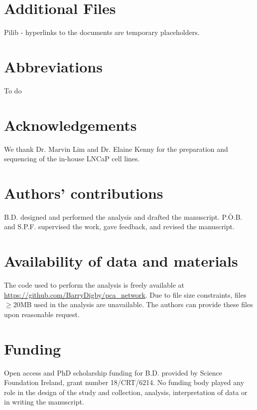 \documentclass[twocolumn]{bmcart}%
\begin{document}

\begin{backmatter}

\section*{Additional Files}
Pilib - hyperlinks to the documents are temporary placeholders. 

\section*{Abbreviations}%
To do 

\section*{Acknowledgements}%
We thank Dr. Marvin Lim and Dr. Elaine Kenny for the preparation and sequencing of the in-house LNCaP cell lines.

\section*{Authors' contributions}
B.D. designed and performed the analysis and drafted the manuscript. P.\`{O}.B. and S.P.F. supervised the work, gave feedback, and revised the manuscript.

\section*{Availability of data and materials}%
The code used to perform the analysis is freely available at \href{https://github.com/BarryDigby/pca_network}{https://github.com/BarryDigby/pca\_network}. Due to file size constraints, files $\geq$20MB used in the analysis are unavailable. The authors can provide these files upon reasonable request.

\section*{Funding}%
Open access and PhD scholarship funding for B.D. provided by Science Foundation Ireland, grant number 18/CRT/6214. No funding body played any role in the design of the study and collection, analysis, interpretation of data or in writing the manuscript.


\end{backmatter}
\end{document}
